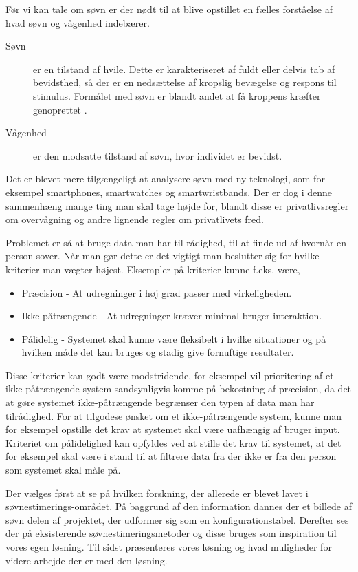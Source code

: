 Før vi kan tale om søvn er der nødt til at blive opstillet en fælles forståelse af hvad søvn og vågenhed indebærer.
\begin{description}
		\item[Søvn] er en tilstand af hvile. Dette er karakteriseret af fuldt eller delvis tab af bevidsthed, så der er en nedsættelse af kropslig bevægelse og respons til stimulus. Formålet med søvn er blandt andet at få kroppens kræfter genoprettet \citep{misc:SleepDefinition}.
		\item[Vågenhed] er den modsatte tilstand af søvn, hvor individet er bevidst.
\end{description}

Det er blevet mere tilgængeligt at analysere søvn med ny teknologi, som for eksempel smartphones, smartwatches og smartwristbands.
Der er dog i denne sammenhæng mange ting man skal tage højde for, blandt disse er privatlivsregler om overvågning og andre lignende regler om privatlivets fred.

Problemet er så at bruge data man har til rådighed, til at finde ud af hvornår en person sover.
Når man gør dette er det vigtigt man beslutter sig for hvilke kriterier man vægter højest.
Eksempler på kriterier kunne f.eks. være,

\begin{itemize}
	\item Præcision - At udregninger i høj grad passer med virkeligheden.
	\item Ikke-påtrængende - At udregninger kræver minimal bruger interaktion.
	\item Pålidelig - Systemet skal kunne være fleksibelt i hvilke situationer og på hvilken måde det kan bruges og stadig give fornuftige resultater.
\end{itemize}

Disse kriterier kan godt være modstridende, for eksempel vil prioritering af et ikke-påtrængende system sandsynligvis komme på bekostning af præcision, da det at gøre systemet ikke-påtrængende begrænser den typen af data man har tilrådighed.
For at tilgodese ønsket om et ikke-påtrængende system, kunne man for eksempel opstille det krav at systemet skal være uafhængig af bruger input.
Kriteriet om pålidelighed kan opfyldes ved at stille det krav til systemet, at det for eksempel skal være i stand til at filtrere data fra der ikke er fra den person som systemet skal måle på.

Der vælges først at se på hvilken forskning, der allerede er blevet lavet i søvnestimerings-området.
På baggrund af den information dannes der et billede af søvn delen af projektet, der udformer sig som en konfigurationstabel.
Derefter ses der på eksisterende søvnestimeringsmetoder og disse bruges som inspiration til vores egen løsning.
Til sidst præsenteres vores løsning og hvad muligheder for videre arbejde der er med den løsning. 